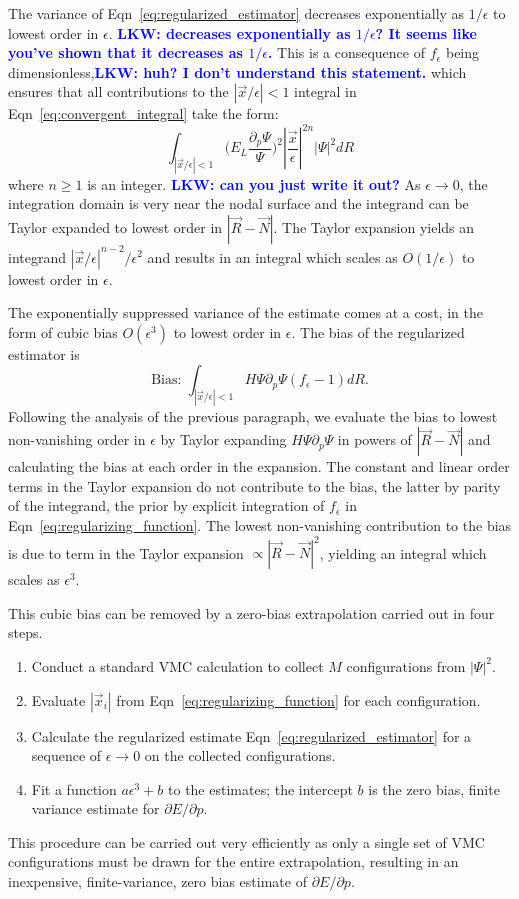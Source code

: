 \documentclass[twocolumn]{revtex4-1}
\newcommand{\lucas}[1]{\textbf{\textcolor{blue}{LKW: #1}}}
\begin{document}
The variance of Eqn~\ref{eq:regularized_estimator} decreases exponentially as $1/\epsilon$ to lowest order in $\epsilon$.
\lucas{decreases exponentially as $1/\epsilon$? It seems like you've shown that it decreases as $1/\epsilon$.}
This is a consequence of $f_\epsilon$ being dimensionless,\lucas{huh? I don't understand this statement.} which ensures that all contributions to the $|\vec{x}/\epsilon|< 1$ integral in Eqn~\ref{eq:convergent_integral} take the form:
\begin{equation}
\int_{|\vec{x}/\epsilon|< 1} \Big(E_L\frac{\partial_p\Psi}{\Psi}\Big)^2 |\frac{\vec{x}}{\epsilon}|^{2n} |\Psi|^2 dR
\end{equation} 
where $n \geq 1$ is an integer.
\lucas{can you just write it out?}
As $\epsilon \rightarrow 0$, the integration domain is very near the nodal surface and the integrand can be Taylor expanded to lowest order in $|\vec{R}-\vec{N}|$. 
The Taylor expansion yields an integrand $|\vec{x}/\epsilon|^{n-2}/\epsilon^2$ and results in an integral which scales as $O(1/\epsilon)$ to lowest order in $\epsilon$.

The exponentially suppressed variance of the estimate comes at a cost, in the form of cubic bias $O(\epsilon^3)$ to lowest order in $\epsilon$.
The bias of the regularized estimator is
\begin{equation}
\text{Bias: } \int_{|\vec{x}/\epsilon|< 1} H\Psi \partial_p \Psi (f_\epsilon - 1) dR.
\label{eq:estimator_bias}
\end{equation}
Following the analysis of the previous paragraph, we evaluate the bias to lowest non-vanishing order in $\epsilon$ by Taylor expanding $H\Psi \partial_p\Psi$ in powers of $|\vec{R} - \vec{N}|$ and calculating the bias at each order in the expansion.
The constant and linear order terms in the Taylor expansion do not contribute to the bias, the latter by parity of the integrand, the prior by explicit integration of $f_\epsilon$ in Eqn~\ref{eq:regularizing_function}.
The lowest non-vanishing contribution to the bias is due to term in the Taylor expansion $\propto |\vec{R} - \vec{N}|^2$, yielding an integral which scales as $\epsilon^3$.

This cubic bias can be removed by a zero-bias extrapolation carried out in four steps.
\begin{enumerate}
\item Conduct a standard VMC calculation to collect $M$ configurations from $|\Psi|^2$.
\item Evaluate $|\vec{x}_i|$ from Eqn~\ref{eq:regularizing_function} for each configuration.
\item Calculate the regularized estimate Eqn~\ref{eq:regularized_estimator} for a sequence of $\epsilon \rightarrow 0$ on the collected configurations.
\item Fit a function $a\epsilon^3 + b$ to the estimates; the intercept $b$ is the zero bias, finite variance estimate for $\partial E/\partial p$.
\end{enumerate}
This procedure can be carried out very efficiently as only a single set of VMC configurations must be drawn for the entire extrapolation, resulting in an inexpensive, finite-variance, zero bias estimate of $\partial E/\partial p$.
\end{document}
